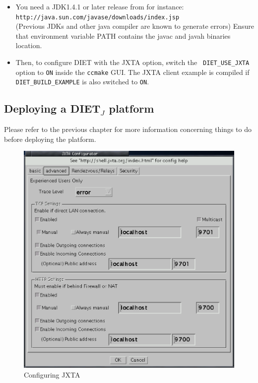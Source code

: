 \begin{itemize}
\item{You need a JDK1.4.1 or later release from for instance:\\
    \noindent
    {\footnotesize
      \texttt{http://java.sun.com/javase/downloads/index.jsp} }\\
      (Previous JDKs and other java compiler are known to generate
      errors) Ensure that environment variable PATH contains the javac
      and javah binaries location.}
  
\item{Then, to configure DIET with the JXTA option, switch the {\tt
    DIET\_USE\_JXTA} option to {\tt ON} inside the {\tt ccmake}
    GUI. The JXTA client example is compiled if {\tt
    DIET\_BUILD\_EXAMPLE} is also switched to {\tt ON}.}

\end{itemize}

\subsection {Deploying a DIET$_{J}$ platform}
\label{ssec:deployjxta}



Please refer to the previous chapter for more information concerning
things to do before deploying the platform.

\begin{figure}[htb]
 \begin{center}
   \includegraphics[scale=0.6]{fig/JXTAConfig}
  \caption{Configuring JXTA \label{fig:platformjxta}}
 \end{center}
\end{figure}


